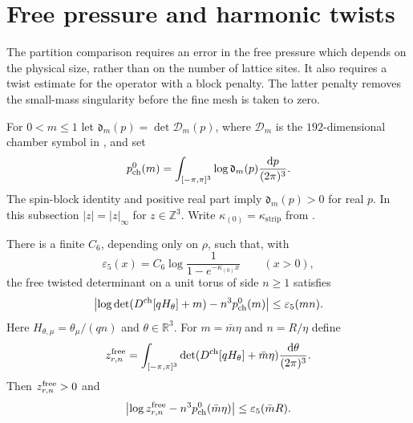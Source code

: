 \documentclass[11pt,letterpaper,reqno]{amsart}
\newcommand{\R}{\mathbb R}
\newcommand{\Z}{\mathbb Z}
\newcommand{\dd}{\mathrm d}
\begin{document}
\section{Free pressure and harmonic twists}
\label{subsec:term-free-determinants}

The partition comparison requires an error in the free pressure
which depends on the physical size, rather than on the number of
lattice sites. It also requires a twist estimate for the operator
with a block penalty. The latter penalty removes the small-mass
singularity before the fine mesh is taken to zero.

For $0<m\le1$ let
$\mathfrak d_m(p)=\det\mathcal D_m(p)$, where
$\mathcal D_m$ is the $192$-dimensional chamber symbol in
\cite[\S2.2]{FermionBlock}, and set
\begin{equation}\label{eq:term-free-pressure}
 p_{\rm ch}^0(m)=
       \int_{[-\pi,\pi]^3}\log\mathfrak d_m(p)
                                      \frac{\dd p}{(2\pi)^3}.
\end{equation}
The spin-block identity and positive real part imply
$\mathfrak d_m(p)>0$ for real $p$.
In this subsection $|z|=|z|_\infty$ for $z\in\Z^3$.
Write $\kappa_{(0)}=\kappa_{\mathrm{strip}}$ from
\cite[Proposition~2.2]{FermionBlock}.

\begin{proposition}\label{prop:term-free-pressure}
There is a finite $C_6$, depending only on $\rho$, such that,
with
\begin{equation}\label{eq:term-epsilon-five}
 \varepsilon_5(x)=
 C_6\log\frac1{1-e^{-\kappa_{(0)}x}}\qquad(x>0),
\end{equation}
the free twisted determinant on a unit torus of side $n\ge1$
satisfies
\begin{equation}\label{eq:term-free-pressure-error}
 \left|\log\det(D^{\rm ch}[qH_\theta]+m)
                     -n^3p_{\rm ch}^0(m)\right|
                                 \le\varepsilon_5(mn).
\end{equation}
Here $H_{\theta,\mu}=\theta_\mu/(qn)$ and $\theta\in\R^3$.
For $m=\bar m\eta$ and $n=R/\eta$ define
\[
 z_{r,n}^{\rm free}
       =\int_{[-\pi,\pi]^3}
            \det(D^{\rm ch}[qH_\theta]+\bar m\eta)
                                         \frac{\dd\theta}{(2\pi)^3}.
\]
Then $z_{r,n}^{\rm free}>0$ and
\begin{equation}\label{eq:term-free-average-error}
 \left|\log z_{r,n}^{\rm free}
                 -n^3p_{\rm ch}^0(\bar m\eta)\right|
                              \le\varepsilon_5(\bar mR).
\end{equation}
\end{proposition}
\end{document}
